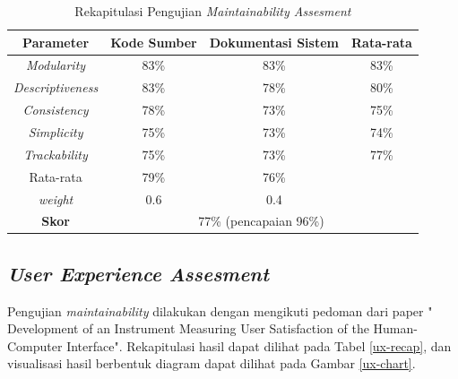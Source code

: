 \begin{table}[h]
	\centering
	\caption{Rekapitulasi Pengujian \textit{Maintainability Assesment}}
	\label{maintainability-recap}
	\begin{tabular}{c|c|c|c}
		\toprule
		\textbf{Parameter} & \textbf{Kode Sumber} & \textbf{Dokumentasi Sistem} & \textbf{Rata-rata} \\
		\hline
		
		\textit{Modularity} & 83\% & 83\% & 83\% \\ 
		\textit{Descriptiveness} & 83\% & 78\% & 80\% \\ 
		\textit{Consistency} & 78\% & 73\% & 75\% \\ 
		\textit{Simplicity} & 75\% & 73\% & 74\% \\ 
		\textit{Trackability} & 75\% & 73\% & 77\% \\ 
		Rata-rata & 79\% & 76\% &  \\ 
		\textit{weight} & 0.6 & 0.4 &  \\ \hline
		\textbf{Skor} & \multicolumn{3}{|c}{77\% (pencapaian 96\%)} \\ \hline
	\end{tabular}
\end{table}

\subsection{\textit{User Experience Assesment}}
Pengujian \textit{maintainability} dilakukan dengan mengikuti pedoman dari paper " Development of an Instrument Measuring User Satisfaction of the Human-Computer Interface"\cite{chin_development_1998}. Rekapitulasi hasil dapat dilihat pada Tabel \ref{ux-recap}, dan visualisasi hasil berbentuk diagram dapat dilihat pada Gambar \ref{ux-chart}.


